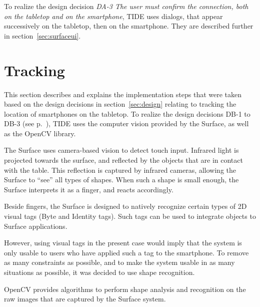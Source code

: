 To realize the design decision
\emph{DA-3 The user must confirm the connection, both on the tabletop and on the smartphone},
TIDE uses dialogs, that appear successively on the tabletop, then on the smartphone.
They are described further in section~\ref{sec:surfaceui}.

\section{Tracking}
\label{sec:tracking}

This section describes and explains the implementation steps that were taken based on the design decisions in section~\ref{sec:design} relating to tracking the location of smartphones on the tabletop.
To realize the design decisions DB-1 to DB-3 (see p.~\pageref{DB}), TIDE uses the computer vision provided by the Surface, as well as the OpenCV library.

The Surface uses camera-based vision to detect touch input.
Infrared light is projected towards the surface, and reflected by the objects that are in contact with the table.
This reflection is captured by infrared cameras, allowing the Surface to ``see'' all types of shapes.
When such a shape is small enough, the Surface interprets it as a finger, and reacts accordingly.

Beside fingers, the Surface is designed to natively recognize certain types of 2D visual tags (Byte and Identity tags).
Such tags can be used to integrate objects to Surface applications.

However, using visual tags in the present case would imply that the system is only usable to users who have applied such a tag to the smartphone.
To remove as many constraints as possible, and to make the system usable in as many situations as possible, it was decided to use shape recognition.

OpenCV provides algorithms to perform shape analysis and recognition on the raw images that are captured by the Surface system. 


